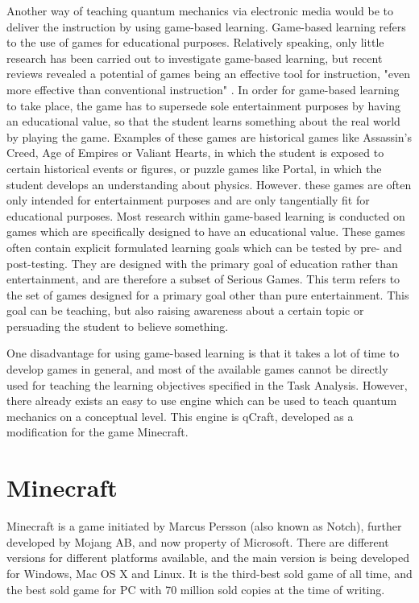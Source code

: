 \documentclass[11pt,twoside]{report} %
\begin{document}
Another way of teaching quantum mechanics via electronic media would be to deliver the instruction by using game-based learning. Game-based learning refers to the use of games for educational purposes. Relatively speaking, only little research has been carried out to investigate game-based learning, but recent reviews revealed a potential of games being an effective tool for instruction, "even more effective than conventional instruction" \cite[p.~1]{wouters}. In order for game-based learning to take place, the game has to supersede sole entertainment purposes by having an educational value, so that the student learns something about the real world by playing the game. Examples of these games are historical games like Assassin's Creed, Age of Empires or Valiant Hearts, in which the student is exposed to certain historical events or figures, or puzzle games like Portal, in which the student develops an understanding about physics. However. these games are often only intended for entertainment purposes and are only tangentially fit for educational purposes. Most research within game-based learning is conducted on games which are specifically designed to have an educational value. These games often contain explicit formulated learning goals which can be tested by pre- and post-testing. They are designed with the primary goal of education rather than entertainment, and are therefore a subset of Serious Games. This term refers to the set of games designed for a primary goal other than pure entertainment. This goal can be teaching, but also raising awareness about a certain topic or persuading the student to believe something.

One disadvantage for using game-based learning is that it takes a lot of time to develop games in general, and most of the available games cannot be directly used for teaching the learning objectives specified in the Task Analysis. However, there already exists an easy to use engine which can be used to teach quantum mechanics on a conceptual level. This engine is qCraft, developed as a modification for the game Minecraft.

\section{Minecraft}

Minecraft is a game initiated by Marcus Persson (also known as Notch), further developed by Mojang AB, and now property of Microsoft. There are different versions for different platforms available, and the main version is being developed for Windows, Mac OS X and Linux. It is the third-best sold game of all time, and the best sold game for PC with 70 million sold copies at the time of writing.
\end{document}
